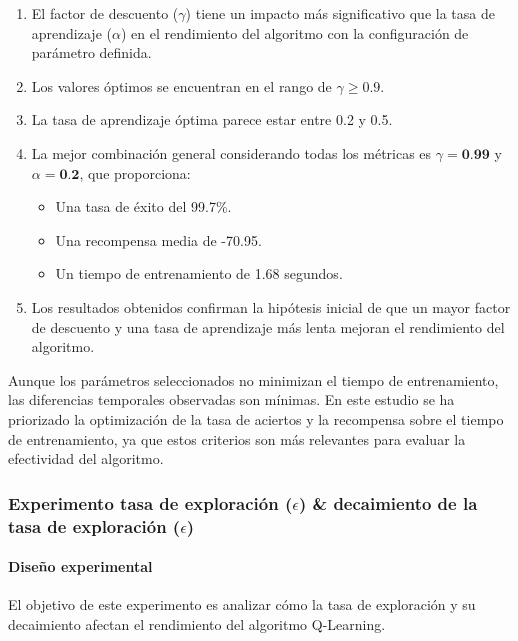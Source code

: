 \begin{enumerate}
    \item El factor de descuento ($\gamma$) tiene un impacto más significativo que la tasa de aprendizaje ($\alpha$) en el rendimiento del algoritmo con la configuración de parámetro definida.
    \item Los valores óptimos se encuentran en el rango de $\gamma \geq 0.9$.
    \item La tasa de aprendizaje óptima parece estar entre 0.2 y 0.5.
    \item La mejor combinación general considerando todas los métricas es $\gamma = \textbf{0.99}$ y $\alpha = \textbf{0.2}$, que proporciona:
    \begin{itemize}
        \item Una tasa de éxito del 99.7\%.
        \item Una recompensa media de -70.95.
        \item Un tiempo de entrenamiento de 1.68 segundos.
    \end{itemize}
    \item Los resultados obtenidos confirman la hipótesis inicial de que un mayor factor de descuento y una tasa de aprendizaje más lenta mejoran el rendimiento del algoritmo.
\end{enumerate}

Aunque los parámetros seleccionados no minimizan el tiempo de entrenamiento, las diferencias temporales observadas son mínimas. En este estudio se ha priorizado la optimización de la tasa de aciertos y la recompensa sobre el tiempo de entrenamiento, ya que estos criterios son más relevantes para evaluar la efectividad del algoritmo.

\newpage
\subsubsection{Experimento tasa de exploración (\(\epsilon\)) \& decaimiento de la tasa de exploración (\(\epsilon\))}

\paragraph{Diseño experimental}
El objetivo de este experimento es analizar cómo la tasa de exploración y su decaimiento afectan el rendimiento del algoritmo Q-Learning.

